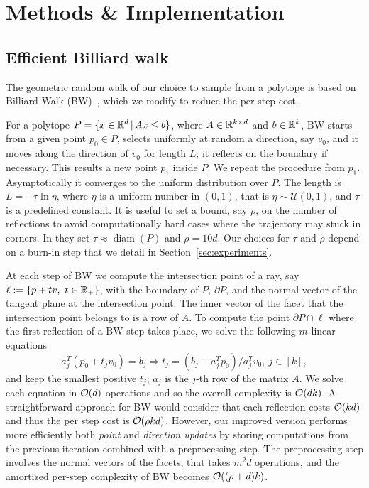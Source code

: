 \section{Methods \& Implementation}
\label{sec:mmcs-methods}

\subsection{Efficient Billiard walk}
\label{subsec:mmcs-methods-bw}

   The geometric random walk of our choice
   to sample from a polytope
   is based on  Billiard Walk (BW)~\citep{Gryazina14},
   which we modify to reduce the per-step cost.

   For a polytope $P = \{ x \in {\mathbb R}^d \,|\, A x \leq b  \}$,
   where $A \in {\mathbb R}^{k \times d}$ and $b \in {\mathbb R}^k$,
   BW starts from a given point $p_0 \in P$,
   selects uniformly at random a
   direction, say $v_0$, and it moves along the direction of $v_0$ for length $L$;
   it reflects on the boundary if necessary. This results a new point $p_1$ inside
   $P$. We repeat the procedure from $p_1$. Asymptotically it converges to the
   uniform distribution over $P$. The length is $L=-\tau \ln \eta$, where $\eta$ is
   a uniform number in $(0,1)$, that is $\eta\sim\mathcal{U}(0,1)$, and $\tau$ is a
   predefined constant. It is useful to set a bound, say $\rho$, on the number of
   reflections to avoid computationally hard cases where the trajectory may stuck
   in corners. In \citep{Gryazina14} they set
   $\tau \approx \mathop{diam}(P)$ and $\rho =10d$.
   Our choices for $\tau$ and $\rho$ depend on a
   burn-in step that we detail in  Section~\ref{sec:experiments}.

   At each step of BW we
   compute the intersection point of a ray, say $\ell:=\{p+tv,\ t\in{\mathbb R}_+ \}$,
   with the boundary of $P$, $\partial P$, and the normal vector of the tangent
   plane at the intersection point.
   The inner vector of the facet that the intersection  point belongs to is a row of $A$.
   To compute the point $\partial P\cap\ell$ where the first reflection of a BW
   step takes place, we solve the following $m$ linear equations
   \begin{equation}\label{eq:boundary_oracle}
   a_j^T(p_0 + t_jv_0) = b_j \Rightarrow t_j = (b_j - a_j^Tp_0) / a_j^Tv_0,\ j \in[k],
   \end{equation}
   and keep the smallest positive $t_j$; $a_j$ is the $j$-th row of the matrix $A$.
   We solve each equation in $\mathcal{O}(d)$ operations
   and so the overall complexity is $\mathcal{O}(dk)$.
   A straightforward approach for BW would consider that each reflection costs $\mathcal{O}(kd)$ and thus the per step cost is $\mathcal{O}(\rho kd)$.
   However, our improved version performs more efficiently both \textit{point} and \textit{direction updates} by storing computations from the previous iteration combined with a preprocessing step. The preprocessing step involves the normal vectors of the facets, that takes $m^2 d$ operations,
   and the amortized per-step complexity of BW becomes $\mathcal{O}((\rho + d)k)$.

